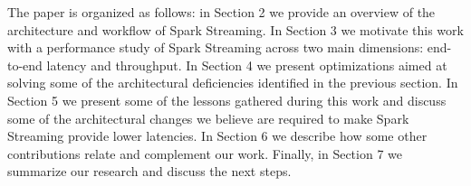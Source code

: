The paper is organized as follows: 
in Section 2 we provide an overview of the architecture and workflow of Spark Streaming. 
In Section 3 we motivate this work with a performance study of Spark Streaming across two main dimensions: end-to-end latency and throughput.
In Section 4 we present optimizations aimed at solving some of the architectural deficiencies identified in the previous section.
In Section 5 we present some of the lessons gathered during this work and discuss some of the architectural changes we believe are required to make Spark Streaming provide lower latencies.
In Section 6 we describe how some other contributions relate and complement our work.
Finally, in Section 7 we summarize our research and discuss the next steps.


